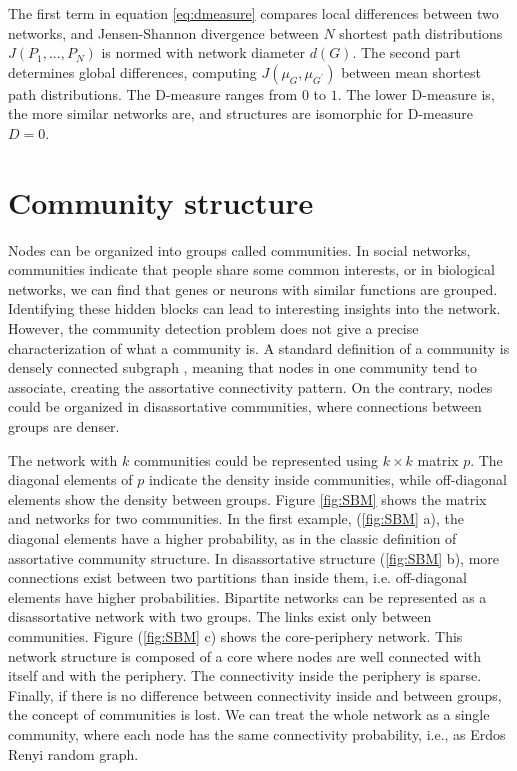 The first term in equation \ref{eq:dmeasure} compares local differences between two networks, and Jensen-Shannon divergence between $N$ shortest path distributions $J(P_{1},..., P_{N})$ is normed with network diameter $d(G)$. The second part determines global differences, computing  ${J(\mu_{G},\mu_{G^{'}})}$ between mean shortest path distributions. The D-measure ranges from $0$ to $1$. The lower D-measure is, the more similar networks are, and structures are isomorphic for D-measure $D = 0$.


\section{Community structure}

Nodes can be organized into groups called communities. In social networks, communities indicate that people share some common interests, or in biological networks, we can find that genes or neurons with similar functions are grouped. Identifying these hidden blocks can lead to interesting insights into the network. However, the community detection problem does not give a precise characterization of what a community is. A standard definition of a community is densely connected subgraph \cite{fortunato2010community, martin}, meaning that nodes in one community tend to associate, creating the assortative connectivity pattern. On the contrary, nodes could be organized in disassortative communities, where connections between groups are denser. 

The network with $k$ communities could be represented using $k \times k$ matrix $p$. The diagonal elements of $p$ indicate the density inside communities, while off-diagonal elements show the density between groups. Figure \ref{fig:SBM} \cite{fortunato2016community} shows the matrix and networks for two communities. In the first example, (\ref{fig:SBM} a), the diagonal elements have a higher probability, as in the classic definition of assortative community structure. In disassortative structure (\ref{fig:SBM} b), more connections exist between two partitions than inside them, i.e. off-diagonal elements have higher probabilities. Bipartite networks can be represented as a disassortative network with two groups. The links exist only between communities. Figure (\ref{fig:SBM} c) shows the core-periphery network. This network structure is composed of a core where nodes are well connected with itself and with the periphery. The connectivity inside the periphery is sparse. Finally, if there is no difference between connectivity inside and between groups, the concept of communities is lost. We can treat the whole network as a single community, where each node has the same connectivity probability, i.e., as Erdos Renyi random graph. 

